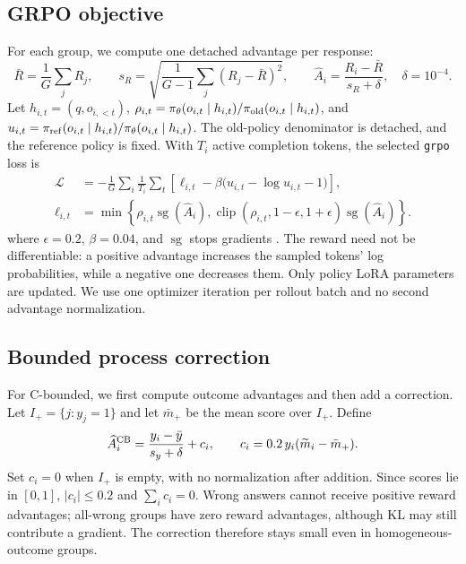 \documentclass{article}
\newcommand{\sg}{\operatorname{sg}}
\newcommand{\clip}{\operatorname{clip}}
\begin{document}
\subsection{GRPO objective}
For each group, we compute one detached advantage per response:
\begin{equation}
 \bar R=\frac1G\sum_jR_j,\qquad
 s_R=\sqrt{\frac1{G-1}\sum_j(R_j-\bar R)^2},\qquad
 \widehat A_i=\frac{R_i-\bar R}{s_R+\delta},\quad\delta=10^{-4}.
 \label{eq:advantage}
\end{equation}
Let $h_{i,t}=(q,o_{i,<t})$, $\rho_{i,t}=\pi_\theta(o_{i,t}\mid h_{i,t})/\pi_{\rm old}(o_{i,t}\mid h_{i,t})$, and $u_{i,t}=\pi_{\rm ref}(o_{i,t}\mid h_{i,t})/\pi_\theta(o_{i,t}\mid h_{i,t})$. The old-policy denominator is detached, and the reference policy is fixed. With $T_i$ active completion tokens, the selected \texttt{grpo} loss is
\begin{equation}
 \begin{aligned}
 \mathcal L&=-\frac1G\sum_i\frac1{T_i}\sum_t
 \left[\ell_{i,t}-\beta\bigl(u_{i,t}-\log u_{i,t}-1\bigr)\right],\\
 \ell_{i,t}&=\min\!\left\{\rho_{i,t}\sg(\widehat A_i),
 \clip(\rho_{i,t},1-\epsilon,1+\epsilon)\sg(\widehat A_i)\right\}.
 \end{aligned}
 \label{eq:loss}
\end{equation}
where $\epsilon=0.2$, $\beta=0.04$, and $\sg$ stops gradients \citep{shao2024,trl}. The reward need not be differentiable: a positive advantage increases the sampled tokens' log probabilities, while a negative one decreases them. Only policy LoRA parameters are updated. We use one optimizer iteration per rollout batch and no second advantage normalization.

\subsection{Bounded process correction}
For C-bounded, we first compute outcome advantages and then add a correction. Let $I_+=\{j:y_j=1\}$ and let $\bar m_+$ be the mean score over $I_+$. Define
\begin{equation}
 \widehat A_i^{\rm CB}=\frac{y_i-\bar y}{s_y+\delta}+c_i,
 \qquad c_i=0.2\,y_i(\widetilde m_i-\bar m_+).
 \label{eq:bounded}
\end{equation}
Set $c_i=0$ when $I_+$ is empty, with no normalization after addition. Since scores lie in $[0,1]$, $|c_i|\leq0.2$ and $\sum_i c_i=0$. Wrong answers cannot receive positive reward advantages; all-wrong groups have zero reward advantages, although KL may still contribute a gradient. The correction therefore stays small even in homogeneous-outcome groups.
\end{document}
